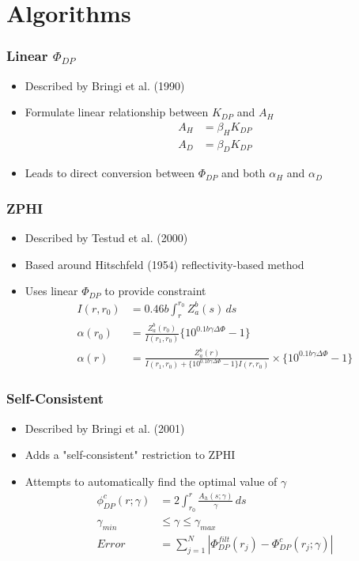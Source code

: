 \documentclass[red]{beamer}
\begin{document}
\section{Algorithms}
\begin{frame}
	\frametitle{Linear $\Phi_{DP}$}
	\begin{itemize}
		\item Described by Bringi et al. (1990)
		\item Formulate linear relationship between $K_{DP}$ and $A_H$
		\begin{align*}
			A_H &= \beta_H K_{DP} \\
			A_D &= \beta_D K_{DP}
		\end{align*}
		\item Leads to direct conversion between $\Phi_{DP}$  and  both
				$\alpha_H$ and $\alpha_D$
	\end{itemize}
\end{frame}

\begin{frame}
	\frametitle{ZPHI}
	\begin{itemize}
		\item Described by Testud et al. (2000)
		\item Based around Hitschfeld (1954) reflectivity-based method
		\item Uses linear $\Phi_{DP}$ to provide constraint
			\begin{align*}
			I(r, r_0) &= \num{0.46}b\int_r^{r_0}Z_a^b(s)\,ds \\
			\alpha(r_0) &= \frac{Z_a^b(r_0)}{I(r_1,r_0)} \lbrace 10^{\num{0.1}b\gamma\Delta\Phi} - 1\rbrace \\
			\alpha(r) &= \frac{Z_a^b(r)}{I(r_1,r_0) + \lbrace 10^{\num{0.1}b\gamma\Delta\Phi} - 1\rbrace I(r, r_0)}
			  \times \lbrace 10^{\num{0.1}b\gamma\Delta\Phi} - 1\rbrace
			\end{align*}
	\end{itemize}
\end{frame}

\begin{frame}
	\frametitle{Self-Consistent}
	\begin{itemize}
		\item Described by Bringi et al. (2001)
		\item Adds a "self-consistent" restriction to ZPHI
		\item Attempts to automatically find the optimal value of $\gamma$
			 \begin{align*}
			\phi_{DP}^c(r;\gamma) &= 2 \int_{r_0}^r \frac{A_h(s;\gamma)}{\gamma}\,ds \\
			\gamma_{min} &\leq \gamma \leq \gamma_{max} \\
			Error &= \sum_{j=1}^N \left| \Phi_{DP}^{filt}(r_j) - \Phi_{DP}^c(r_j;\gamma) \right|
			\end{align*}
	\end{itemize}
\end{frame}
\end{document}
